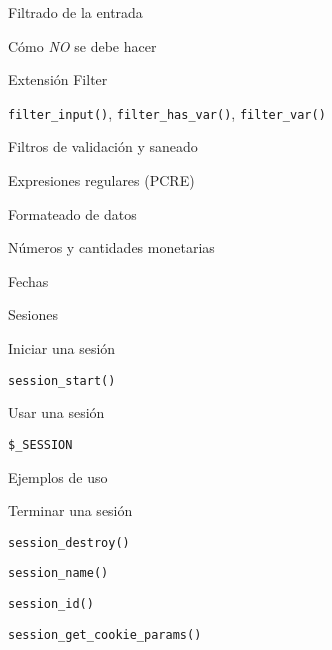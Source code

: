 \begin{longenum}
\begin{longenum}
        \item Filtrado de la entrada
        \begin{longenum}
            \item Cómo \textit{NO} se debe hacer
            \item Extensión Filter
            \begin{longenum}
                \item \texttt{filter\_input()}, \texttt{filter\_has\_var()}, \texttt{filter\_var()}
                \item Filtros de validación y saneado
            \end{longenum}
            \item Expresiones regulares (PCRE)
        \end{longenum}
        \item Formateado de datos
        \begin{longenum}
            \item Números y cantidades monetarias
            \item Fechas
        \end{longenum}
        \item Sesiones
        \begin{longenum}
            \item Iniciar una sesión
            \begin{longenum}
                \item \texttt{session\_start()}
            \end{longenum}
            \item Usar una sesión
            \begin{longenum}
                \item \texttt{\$\_SESSION}
                \item Ejemplos de uso
            \end{longenum}
            \item Terminar una sesión
            \begin{longenum}
                \item \texttt{session\_destroy()}
                \item \texttt{session\_name()}
                \item \texttt{session\_id()}
                \item \texttt{session\_get\_cookie\_params()}
            \end{longenum}
        \end{longenum}

\end{longenum}
\end{longenum}
